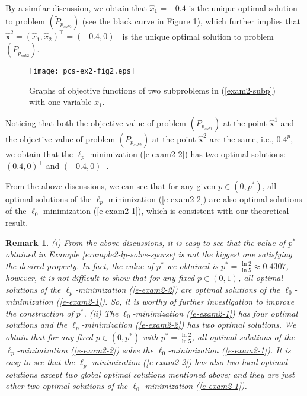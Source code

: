 \documentclass[12pt]{article}
\newtheorem{Remark}{Remark}[part]
\begin{document}
By a similar discussion, we obtain that $\hat{x}_1=-0.4$ is the unique optimal solution to problem $(\tilde{P}_{p_{sub2}})$ (see the black curve in Figure \ref{examples2-2}), which further implies that $\hat{\mathbf{x}}^2=(\hat{x}_1,\hat{x}_2)^\top=(-0.4,0)^\top$ is the unique optimal solution to problem $(P_{p_{sub2}})$.

\begin{figure}[ht]
\centering
\texttt{[image: pcs-ex2-fig2.eps]}
\caption{Graphs of objective functions of two subproblems in (\ref{exam2-subp}) with one-variable $x_1$.}
\label{examples2-2}
\end{figure}

Noticing that both the objective value of problem $(P_{p_{sub1}})$ at the point $\hat{\mathbf{x}}^1$ and the objective value of problem $(P_{p_{sub2}})$ at the point $\hat{\mathbf{x}}^2$ are the same, i.e., $0.4^p$, we obtain that the $\ell_p$-minimization (\ref{e-exam2-2}) has two optimal solutions: $(0.4,0)^{\top}$ and  $(-0.4,0)^{\top}$.

From the above discussions, we can see that for any given $p\in (0,p^\ast)$, all optimal solutions of the $\ell_p$-minimization (\ref{e-exam2-2}) are also optimal solutions of the $\ell_0$-minimization (\ref{e-exam2-1}), which is consistent with our theoretical result.

\begin{Remark}
(i) From the above discussions, it is easy to see that the value of $p^\ast$ obtained in Example \ref{example2-lp-solve-sparse} is not the biggest one satisfying the desired property. In fact, the value of $p^\ast$ we obtained is $p^\ast=\frac{\ln 2}{\ln 5}\approx 0.4307$, however, it is not difficult to show that for any fixed $p\in (0,1)$, all optimal solutions of the $\ell_p$-minimization (\ref{e-exam2-2}) are optimal solutions of the $\ell_0$-minimization (\ref{e-exam2-1}). So, it is worthy of further investigation to improve the construction of $p^\ast$. (ii) The $\ell_0$-minimization (\ref{e-exam2-1}) has four optimal solutions and the $\ell_p$-minimization (\ref{e-exam2-2}) has two optimal solutions. We obtain that for any fixed $p\in (0,p^\ast)$ with $p^\ast=\frac{\ln 2}{\ln 5}$, all optimal solutions of the $\ell_p$-minimization (\ref{e-exam2-2}) solve the $\ell_0$-minimization (\ref{e-exam2-1}). It is easy to see that the $\ell_p$-minimization (\ref{e-exam2-2}) has also two local optimal solutions except two global optimal solutions mentioned above; and they are just other two optimal solutions of the $\ell_0$-minimization (\ref{e-exam2-1}).
\end{Remark}
\end{document}
